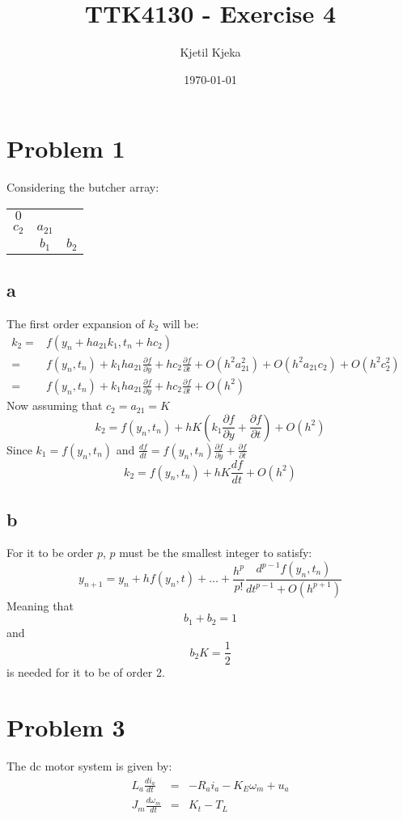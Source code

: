 \documentclass[11pt]{article}
\author{Kjetil Kjeka}
\title{TTK4130 - Exercise 4}
\date{\today}
\begin{document}
\maketitle
\section*{Problem 1}
Considering the butcher array: \\
\begin{tabular}{c|c c}
$0$ & & \\
$c_2$ & $a_{21}$ & \\ \hline
& $b_1$ & $b_2$
\end{tabular}
\subsection*{a}
The first order expansion of $k_2$ will be:
\begin{eqnarray*}
k_2 =& f(y_n + h a_{21} k_1, t_n + h c_2) &\\
=& f(y_n, t_n) + k_1 h a_{21} \frac{\partial f}{\partial y} + h c_2 \frac{\partial f}{\partial t} + O(h^2 a_{21}^2) + O(h^2 a_{21} c_2) + O(h^2 c_2^2) &\\
=& f(y_n, t_n) + k_1 h a_{21} \frac{\partial f}{\partial y} + h c_2 \frac{\partial f}{\partial t} + O(h^2) &
\end{eqnarray*}
Now assuming that $c_2 = a_{21} = K$ 
\[k_2 = f(y_n, t_n) + hK( k_1\frac{\partial f}{\partial y} + \frac{\partial f}{\partial t}) + O(h^2)\]
Since $k_1 = f(y_n, t_n)$ and $\frac{df}{dt} = f(y_n, t_n) \frac{\partial f}{\partial y} + \frac{\partial f}{\partial t}$
\[k_2 = f(y_n, t_n) + hK \frac{df}{dt} + O(h^2) \]


\subsection*{b}
For it to be order $p$, $p$ must be the smallest integer to satisfy:
\[ y_{n+1} = y_n + h f(y_n, t) + \dots + \frac{h^p}{p!} \frac{d^{p-1} f(y_n, t_n)}{dt^{p-1} + O(h^{p+1})} \]
Meaning that 
\[b_1 + b_2 = 1\] 
and 
\[b_2K = \frac{1}{2}\]
is needed for it to be of order 2.

\section*{Problem 3}
The dc motor system is given by:
\begin{eqnarray*}
L_a \frac{d i_a}{dt} &=& -R_a i_a - K_E \omega_m + u_a \\
J_m \frac{d \omega_m}{dt} &=& K_t - T_L
\end{eqnarray*}
\end{document}

